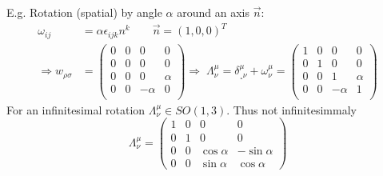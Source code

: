 E.g. Rotation (spatial) by angle $\alpha$ around an axis $\vec{n}$:
\begin{align*}
	\omega_{ij} &= \alpha \epsilon_{ijk} n^k \qquad \vec{n} = (1,0,0)^T\\
	\Rightarrow 	w_{\rho \sigma} &=
	\begin{pmatrix}
		0&0&0&0\\
		0&0&0&0 \\
		0&0&0&\alpha \\
		0&0&-\alpha &0\\
	\end{pmatrix}
	\Rightarrow \; \Lambda^{\mu}_{\nu} = \delta^{\mu}_{¸\nu} + \omega^{\mu}_{\nu} = 
	\begin{pmatrix}
		1 &0&0&0\\
		0&1&0&0 \\
		0&0&1&\alpha \\
		0&0&-\alpha &1 \\
	\end{pmatrix}
\end{align*}
For an infinitesimal rotation $\Lambda^{\mu}_{\nu} \in SO(1,3)$. Thus not infinitesimmaly
\begin{equation}
\Lambda^{\mu}_{\nu} = 
\begin{pmatrix}
1&0&0&0\\
0&1&0&0 \\
0&0& \cos \alpha & -\sin \alpha \\
0&0& \sin\alpha & \cos \alpha
\end{pmatrix}
\end{equation}


